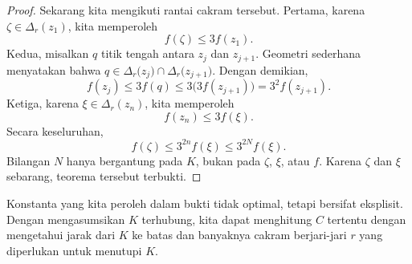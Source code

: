 \documentclass[12pt,openany]{book}
\theoremstyle{plain}
\theoremstyle{remark}
\theoremstyle{definition}
\theoremstyle{exercise}
\theoremstyle{example}
\begin{document}
\begin{proof}
Sekarang kita mengikuti rantai cakram tersebut.
Pertama, karena $\zeta \in \Delta_r(z_1)$, kita memperoleh 
\begin{equation*}
f(\zeta) \leq 3 f(z_1).
\end{equation*}
Kedua, misalkan
$q$ titik tengah antara $z_{j}$ dan $z_{j+1}$.
Geometri sederhana menyatakan bahwa
$q \in \Delta_{r}\bigl(z_{j}\bigr) \cap \Delta_{r}\bigl(z_{j+1}\bigr)$.
Dengan demikian,
\begin{equation*}
f(z_j) \leq 3 f(q) \leq 3 \bigl( 3 f(z_{j+1}) \bigr) = 3^2 f(z_{j+1}).
\end{equation*}
Ketiga, karena $\xi \in \Delta_r(z_n)$, kita memperoleh 
\begin{equation*}
f(z_n) \leq 3 f(\xi).
\end{equation*}
Secara keseluruhan,
\begin{equation*}
f(\zeta) \leq
3^{2n}
f(\xi)
\leq
3^{2N}
f(\xi) .
\end{equation*}
Bilangan $N$ hanya bergantung pada $K$, bukan pada $\zeta$, $\xi$, atau $f$.
Karena $\zeta$ dan $\xi$ sebarang, teorema tersebut terbukti.
\end{proof}

Konstanta yang kita peroleh dalam bukti tidak optimal, tetapi bersifat eksplisit.
Dengan mengasumsikan $K$ terhubung,
kita dapat menghitung $C$ tertentu dengan mengetahui jarak dari $K$
ke batas dan banyaknya cakram berjari-jari $r$ yang diperlukan untuk menutupi $K$.
\end{document}
